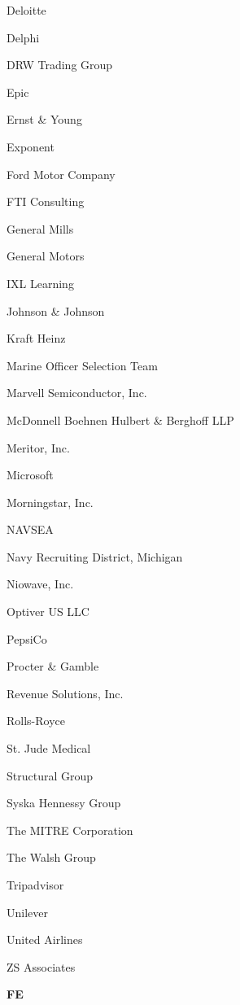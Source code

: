 \documentclass[twoside]{article}
\begin{document}
\begin{center}
\begin{multicols}{5}
\begin{FlushLeft}
\begin{compactitem}
\item Deloitte
\item Delphi
\item DRW Trading Group
\item Epic
\item Ernst \& Young
\item Exponent
\item Ford Motor Company
\item FTI Consulting
\item General Mills
\item General Motors
\item IXL Learning
\item Johnson \& Johnson
\item Kraft Heinz
\item Marine Officer Selection Team
\item Marvell Semiconductor, Inc.
\item McDonnell Boehnen Hulbert \& Berghoff LLP
\item Meritor, Inc.
\item Microsoft
\item Morningstar, Inc.
\item NAVSEA
\item Navy Recruiting District, Michigan
\item Niowave, Inc.
\item Optiver US LLC
\item PepsiCo
\item Procter \& Gamble
\item Revenue Solutions, Inc.
\item Rolls-Royce
\item St. Jude Medical
\item Structural Group
\item Syska Hennessy Group
\item The MITRE Corporation
\item The Walsh Group
\item Tripadvisor
\item Unilever
\item United Airlines
\item ZS Associates
\end{compactitem}
        \end{FlushLeft}
        \vspace{1em}
        {\fontsize{14}{16}\selectfont \bf FE}\\
        \vspace{-1em}
        ~\hrulefill~
        \vspace{-.9em}

\end{multicols}
\end{center}
\end{document}
